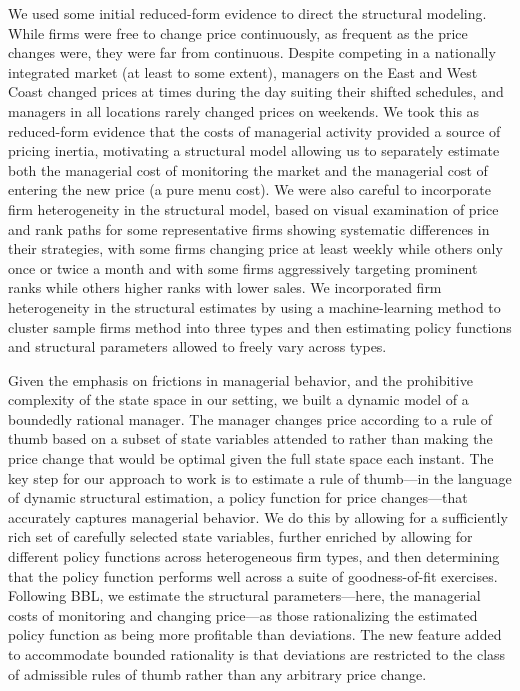 \documentclass[11pt]{article}
\begin{document}
\begin{spacing}{1.3}
We used some initial reduced-form evidence to direct the structural
modeling. While firms were free to change price continuously, as
frequent as the price changes were, they were far from
continuous. Despite competing in a nationally integrated market (at
least to some extent), managers on the East and West Coast changed
prices at times during the day suiting their shifted schedules, and
managers in all locations rarely changed prices on weekends. We took
this as reduced-form evidence that the costs of managerial activity
provided a source of pricing inertia, motivating a structural model
allowing us to separately estimate both the managerial cost of
monitoring the market and the managerial cost of entering the new
price (a pure menu cost).  We were also careful to incorporate firm
heterogeneity in the structural model, based on visual examination of
price and rank paths for some representative firms showing systematic
differences in their strategies, with some firms changing price at
least weekly while others only once or twice a month and with some
firms aggressively targeting prominent ranks while others higher ranks
with lower sales. We incorporated firm heterogeneity in the structural
estimates by using a machine-learning method to cluster sample firms
method into three types and then estimating policy functions and
structural parameters allowed to freely vary across types.

Given the emphasis on frictions in managerial behavior, and the
prohibitive complexity of the state space in our setting, we built a
dynamic model of a boundedly rational manager. The manager changes
price according to a rule of thumb based on a subset of state
variables attended to rather than making the price change that would
be optimal given the full state space each instant. The key step for
our approach to work is to estimate a rule of thumb---in the language
of dynamic structural estimation, a policy function for price
changes---that accurately captures managerial behavior. We do this by
allowing for a sufficiently rich set of carefully selected state
variables, further enriched by allowing for different policy functions
across heterogeneous firm types, and then determining that the policy
function performs well across a suite of goodness-of-fit
exercises. Following BBL, we estimate the structural
parameters---here, the managerial costs of monitoring and changing
price---as those rationalizing the estimated policy function as being
more profitable than deviations. The new feature added to accommodate
bounded rationality is that deviations are restricted to the class of
admissible rules of thumb rather than any arbitrary price change.


\end{spacing}
\end{document}
